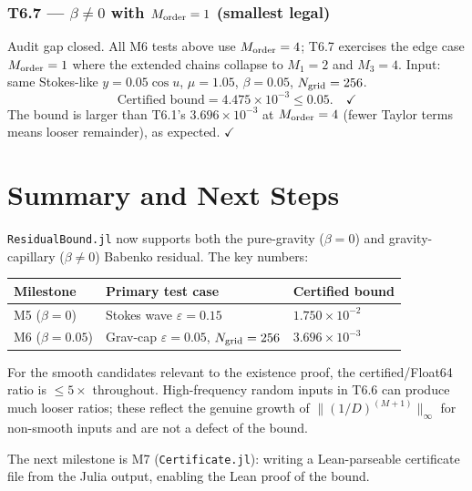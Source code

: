 \documentclass[11pt]{article}
\theoremstyle{definition}
\begin{document}
\subsubsection*{T6.7 --- $\beta\neq 0$ with $M_{\rm order} = 1$ (smallest legal)}
Audit gap closed.  All M6 tests above use $M_{\rm order} = 4$;
T6.7 exercises the edge case $M_{\rm order} = 1$ where the extended chains
collapse to $M_1 = 2$ and $M_3 = 4$.  Input: same Stokes-like
$y = 0.05\cos u$, $\mu = 1.05$, $\beta = 0.05$, $N_{\rm grid} = 256$.
\[
  \text{Certified bound} = 4.475 \times 10^{-3} \le 0.05. \quad \checkmark
\]
The bound is larger than T6.1's $3.696\times10^{-3}$ at $M_{\rm order} = 4$
(fewer Taylor terms means looser remainder), as expected.  $\checkmark$

\section{Summary and Next Steps}

\texttt{ResidualBound.jl} now supports both the pure-gravity ($\beta=0$)
and gravity-capillary ($\beta\neq 0$) Babenko residual.  The key numbers:

\begin{center}
\begin{tabular}{lll}
\toprule
Milestone & Primary test case & Certified bound \\
\midrule
M5 ($\beta=0$) & Stokes wave $\varepsilon=0.15$ & $1.750\times10^{-2}$ \\
M6 ($\beta=0.05$) & Grav-cap $\varepsilon=0.05$, $N_{\rm grid}=256$ & $3.696\times10^{-3}$ \\
\bottomrule
\end{tabular}
\end{center}

For the smooth candidates relevant to the existence proof, the
certified/Float64 ratio is $\le 5\times$ throughout.  High-frequency random
inputs in T6.6 can produce much looser ratios; these reflect the genuine
growth of $\|(1/D)^{(M+1)}\|_\infty$ for non-smooth inputs and are not a
defect of the bound.

The next milestone is M7 (\texttt{Certificate.jl}): writing a
Lean-parseable certificate file from the Julia output, enabling the Lean
proof of the bound.
\end{document}
